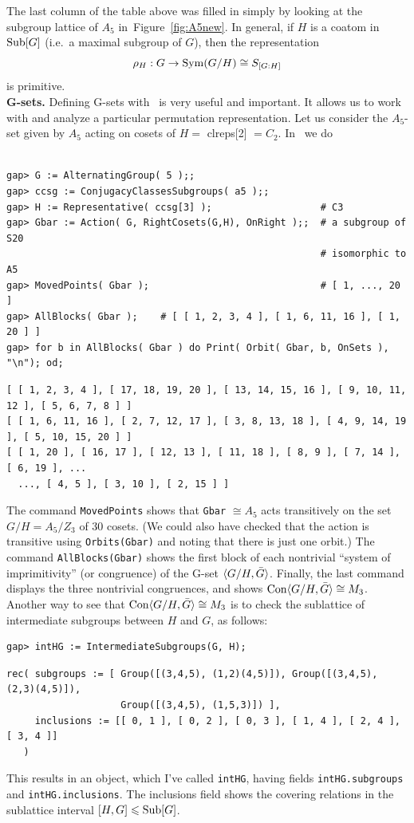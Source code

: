 The last column of the table above was filled in simply 
by looking at the subgroup lattice of $A_5$ in~Figure~\ref{fig:A5new}.  
In general, if $H$ is a coatom in $\operatorname{Sub}[G]$ (i.e.~a maximal subgroup of $G$),
then the representation  
\[
\rho_{H} : G \rightarrow \operatorname{Sym}(G/H) \cong S_{[G:H]}
\] is primitive.
\\[10pt]
{\bf G-sets.} Defining G-sets with \gap\ is very useful and important.  It allows us to work
with and analyze a particular permutation representation.  Let us consider the
$A_5$-set given by $A_5$ acting on cosets of $H=$ {clreps[2]} $=C_2$. In \gap\
we do
{\codesize 
\begin{verbatim}

gap> G := AlternatingGroup( 5 );;
gap> ccsg := ConjugacyClassesSubgroups( a5 );;
gap> H := Representative( ccsg[3] );                   # C3
gap> Gbar := Action( G, RightCosets(G,H), OnRight );;  # a subgroup of S20 
                                                       # isomorphic to A5
gap> MovedPoints( Gbar );                              # [ 1, ..., 20 ]
gap> AllBlocks( Gbar );    # [ [ 1, 2, 3, 4 ], [ 1, 6, 11, 16 ], [ 1, 20 ] ]
gap> for b in AllBlocks( Gbar ) do Print( Orbit( Gbar, b, OnSets ), "\n"); od;
\end{verbatim}}
{\scriptsize 
\begin{verbatim}
[ [ 1, 2, 3, 4 ], [ 17, 18, 19, 20 ], [ 13, 14, 15, 16 ], [ 9, 10, 11, 12 ], [ 5, 6, 7, 8 ] ]
[ [ 1, 6, 11, 16 ], [ 2, 7, 12, 17 ], [ 3, 8, 13, 18 ], [ 4, 9, 14, 19 ], [ 5, 10, 15, 20 ] ]
[ [ 1, 20 ], [ 16, 17 ], [ 12, 13 ], [ 11, 18 ], [ 8, 9 ], [ 7, 14 ], [ 6, 19 ], ...
  ..., [ 4, 5 ], [ 3, 10 ], [ 2, 15 ] ]

\end{verbatim}}
\noindent The command {\tt MovedPoints} shows that {\tt Gbar} $\cong A_5$ acts transitively on the set
$G/H = A_5/Z_3$ of 30 cosets.  (We could also have checked that the action is transitive
using {\tt Orbits(Gbar)} and noting that there is just one orbit.)
The command {\tt AllBlocks(Gbar)} shows 
the first block of each nontrivial ``system of imprimitivity'' (or congruence) of
the G-set $\langle G/H, \bar{G}\rangle$.  Finally, the last command displays the three
nontrivial congruences, and shows $\operatorname{Con} \langle G/H, \bar{G}\rangle\cong M_3$.  Another way
to see that  $\operatorname{Con} \langle G/H, \bar{G}\rangle\cong M_3$ is to check the sublattice of
intermediate subgroups between $H$ and $G$, as follows:
{\codesize 
\begin{verbatim}
gap> intHG := IntermediateSubgroups(G, H);
\end{verbatim}}
{\codesize
\begin{verbatim}
rec( subgroups := [ Group([(3,4,5), (1,2)(4,5)]), Group([(3,4,5), (2,3)(4,5)]), 
                    Group([(3,4,5), (1,5,3)]) ], 
     inclusions := [[ 0, 1 ], [ 0, 2 ], [ 0, 3 ], [ 1, 4 ], [ 2, 4 ], [ 3, 4 ]] 
   )
\end{verbatim}}
\noindent This results in an object, which I've called {\tt intHG}, having fields
{\tt intHG.subgroups} and {\tt intHG.inclusions}.  The inclusions field shows
the covering relations in the sublattice interval $[H, G] \leqslant \operatorname{Sub}[G]$.

